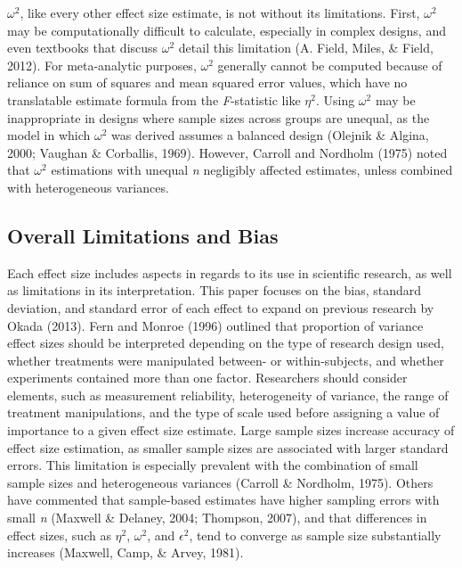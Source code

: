 \documentclass[english,man]{apa6}
\theoremstyle{definition}
\theoremstyle{definition}
\theoremstyle{definition}
\theoremstyle{remark}
\begin{document}
\(\omega^2\), like every other effect size estimate, is not without its
limitations. First, \(\omega^2\) may be computationally difficult to
calculate, especially in complex designs, and even textbooks that
discuss \(\omega^2\) detail this limitation (A. Field, Miles, \& Field,
2012). For meta-analytic purposes, \(\omega^2\) generally cannot be
computed because of reliance on sum of squares and mean squared error
values, which have no translatable estimate formula from the
\emph{F}-statistic like \(\eta^2\). Using \(\omega^2\) may be
inappropriate in designs where sample sizes across groups are unequal,
as the model in which \(\omega^2\) was derived assumes a balanced design
(Olejnik \& Algina, 2000; Vaughan \& Corballis, 1969). However, Carroll
and Nordholm (1975) noted that \(\omega^2\) estimations with unequal
\emph{n} negligibly affected estimates, unless combined with
heterogeneous variances.

\subsection{Overall Limitations and
Bias}\label{overall-limitations-and-bias}

Each effect size includes aspects in regards to its use in scientific
research, as well as limitations in its interpretation. This paper
focuses on the bias, standard deviation, and standard error of each
effect to expand on previous research by Okada (2013). Fern and Monroe
(1996) outlined that proportion of variance effect sizes should be
interpreted depending on the type of research design used, whether
treatments were manipulated between- or within-subjects, and whether
experiments contained more than one factor. Researchers should consider
elements, such as measurement reliability, heterogeneity of variance,
the range of treatment manipulations, and the type of scale used before
assigning a value of importance to a given effect size estimate. Large
sample sizes increase accuracy of effect size estimation, as smaller
sample sizes are associated with larger standard errors. This limitation
is especially prevalent with the combination of small sample sizes and
heterogeneous variances (Carroll \& Nordholm, 1975). Others have
commented that sample-based estimates have higher sampling errors with
small \emph{n} (Maxwell \& Delaney, 2004; Thompson, 2007), and that
differences in effect sizes, such as \(\eta^2\), \(\omega^2\), and
\(\epsilon^2\), tend to converge as sample size substantially increases
(Maxwell, Camp, \& Arvey, 1981).
\end{document}
